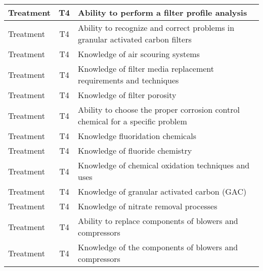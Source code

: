 \documentclass{article}
\begin{document}
\begin{table}[]
\begin{tabular}{|l|c|l|}
Treatment                              & T4             & Ability to perform a   filter profile analysis                                                                                    \\ \hline
Treatment                              & T4             & Ability to recognize   and correct problems in granular activated carbon filters                                                  \\ \hline
Treatment                              & T4             & Knowledge of air   scouring systems                                                                                               \\ \hline
Treatment                              & T4             & Knowledge of filter   media replacement requirements and techniques                                                               \\ \hline
Treatment                              & T4             & Knowledge of filter   porosity                                                                                                    \\ \hline
Treatment                              & T4             & Ability to choose the   proper corrosion control chemical for a specific problem                                                  \\ \hline
Treatment                              & T4             & Knowledge   fluoridation chemicals                                                                                                \\ \hline
Treatment                              & T4             & Knowledge of fluoride   chemistry                                                                                                 \\ \hline
Treatment                              & T4             & Knowledge of chemical   oxidation techniques and uses                                                                             \\ \hline
Treatment                              & T4             & Knowledge of granular   activated carbon (GAC)                                                                                    \\ \hline
Treatment                              & T4             & Knowledge of nitrate   removal processes                                                                                          \\ \hline
Treatment                              & T4             & Ability to replace   components of blowers and compressors                                                                        \\ \hline
Treatment                              & T4             & Knowledge of the   components of blowers and compressors                                                                          \\ \hline
\end{tabular}
\end{table}
\end{document}
